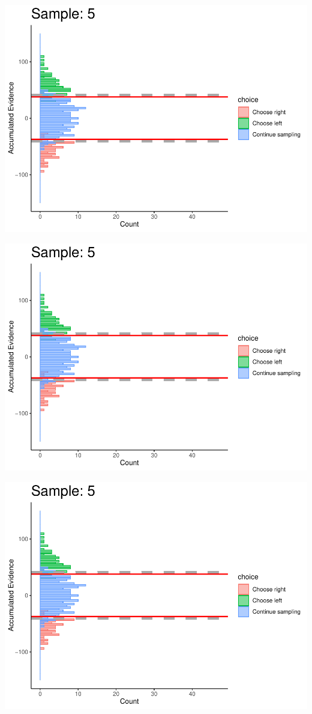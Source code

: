 \documentclass[
]{book}
\begin{document}
\begin{center}\includegraphics[width=0.8\linewidth]{LateNightBayes_files/figure-latex/collapsing_dcb-44} \end{center}

\begin{center}\includegraphics[width=0.8\linewidth]{LateNightBayes_files/figure-latex/collapsing_dcb-45} \end{center}

\begin{center}\includegraphics[width=0.8\linewidth]{LateNightBayes_files/figure-latex/collapsing_dcb-46} \end{center}
\end{document}
